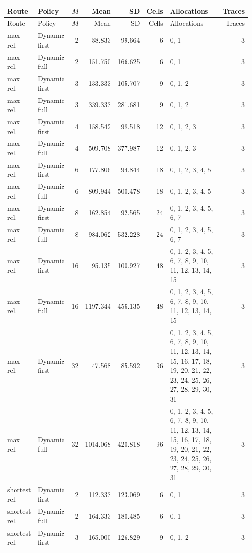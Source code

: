 \documentclass[10pt,a4paper]{article}
\begin{document}
\tiny\setlength{\tabcolsep}{2pt}\begin{longtable}{@{}p{23mm}p{29mm}rrrrp{36mm}r@{}}
\toprule Route & Policy & $M$ & Mean & SD & Cells & Allocations & Traces \\ \midrule\endfirsthead
\toprule Route & Policy & $M$ & Mean & SD & Cells & Allocations & Traces \\ \midrule\endhead
\bottomrule\endfoot
max rel. & Dynamic first & 2 & 88.833 & 99.664 & 6 & 0, 1 & 3 \\
max rel. & Dynamic full & 2 & 151.750 & 166.625 & 6 & 0, 1 & 3 \\
max rel. & Dynamic first & 3 & 133.333 & 105.707 & 9 & 0, 1, 2 & 3 \\
max rel. & Dynamic full & 3 & 339.333 & 281.681 & 9 & 0, 1, 2 & 3 \\
max rel. & Dynamic first & 4 & 158.542 & 98.518 & 12 & 0, 1, 2, 3 & 3 \\
max rel. & Dynamic full & 4 & 509.708 & 377.987 & 12 & 0, 1, 2, 3 & 3 \\
max rel. & Dynamic first & 6 & 177.806 & 94.844 & 18 & 0, 1, 2, 3, 4, 5 & 3 \\
max rel. & Dynamic full & 6 & 809.944 & 500.478 & 18 & 0, 1, 2, 3, 4, 5 & 3 \\
max rel. & Dynamic first & 8 & 162.854 & 92.565 & 24 & 0, 1, 2, 3, 4, 5, 6, 7 & 3 \\
max rel. & Dynamic full & 8 & 984.062 & 532.228 & 24 & 0, 1, 2, 3, 4, 5, 6, 7 & 3 \\
max rel. & Dynamic first & 16 & 95.135 & 100.927 & 48 & 0, 1, 2, 3, 4, 5, 6, 7, 8, 9, 10, 11, 12, 13, 14, 15 & 3 \\
max rel. & Dynamic full & 16 & 1197.344 & 456.135 & 48 & 0, 1, 2, 3, 4, 5, 6, 7, 8, 9, 10, 11, 12, 13, 14, 15 & 3 \\
max rel. & Dynamic first & 32 & 47.568 & 85.592 & 96 & 0, 1, 2, 3, 4, 5, 6, 7, 8, 9, 10, 11, 12, 13, 14, 15, 16, 17, 18, 19, 20, 21, 22, 23, 24, 25, 26, 27, 28, 29, 30, 31 & 3 \\
max rel. & Dynamic full & 32 & 1014.068 & 420.818 & 96 & 0, 1, 2, 3, 4, 5, 6, 7, 8, 9, 10, 11, 12, 13, 14, 15, 16, 17, 18, 19, 20, 21, 22, 23, 24, 25, 26, 27, 28, 29, 30, 31 & 3 \\
shortest rel. & Dynamic first & 2 & 112.333 & 123.069 & 6 & 0, 1 & 3 \\
shortest rel. & Dynamic full & 2 & 164.333 & 180.485 & 6 & 0, 1 & 3 \\
shortest rel. & Dynamic first & 3 & 165.000 & 126.829 & 9 & 0, 1, 2 & 3 \\

\end{longtable}
\end{document}
